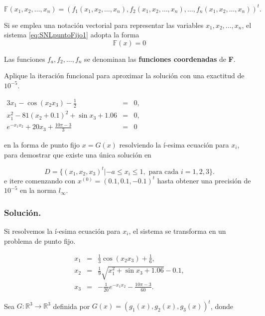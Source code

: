 $$\mathbb{F}(x_1,x_2,\dots,x_n) = (f_1(x_1,x_2,\dots,x_n),f_2(x_1,x_2,\dots,x_n),\dots,f_n(x_1,x_2,\dots,x_n))^t.$$

Si se emplea una notación vectorial para representar las variables $x_1,x_2,\dots,x_n$, el sistema \ref{eq:SNLpuntoFijo1} adopta la forma
\begin{equation}
	\mathbb{F}(x) = 0
\end{equation}

Las funciones $f_a,f_2,\dots,f_n$ se denominan las \textbf{funciones coordenadas} de \textbf{F}.

\begin{exerciseT}
Aplique la iteración funcional para aproximar la solución con una exactitud de $10^{-5}$.

\begin{center}
  $\begin{array}{rcl}
    3x_1 - \cos (x_2x_3) - \frac{1}{2} & = & 0,\\
    x_1^2 - 81(x_2 + 0.1)^2 + \sin x_3 + 1.06 & = & 0,\\
    e^{-x_1x_2} + 20x_3 + \frac{10\pi - 3}{3} & = & 0
  \end{array}$
\end{center}

en la forma de punto fijo $x=G(x)$ resolviendo la í-esima ecuación para $x_i$, para demostrar que existe una única solución en

$$D=\{(x_1,x_2,x_3)^t | -a\leq x_i\leq 1, \mbox{ para cada } i=1,2,3\}.$$
e itere comenzando con $x^{(0)}=(0.1,0.1,-0.1)^t$ hasta obtener una precisión de $10^{-5}$ en la norma $l_\infty$.

\subsubsection*{Solución.}
Si resolvemos la í-esima ecuación para $x_i$, el sistema se transforma en un problema de punto fijo.

\begin{equation}
  \begin{array}{ccl}
    x_1 & = & \frac{1}{3}\cos (x_2x_3) + \frac{1}{6},\\
    x_2 & = & \frac{1}{9}\sqrt{x_1^2 + \sin x_3 + 1.06} - 0.1,\\ 
    x_3 & = & -\frac{1}{20}e^{-x_1x_2}-\frac{10\pi-3}{60}.
  \end{array}
  \label{eq:exSNLpuntoFijo1}
\end{equation}

Sea $G:\mathbb{R}^3\rightarrow\mathbb{R}^3$ definida por $G(x) = (g_1(x),g_2(x),g_3(x))^t$, donde


\end{exerciseT}
